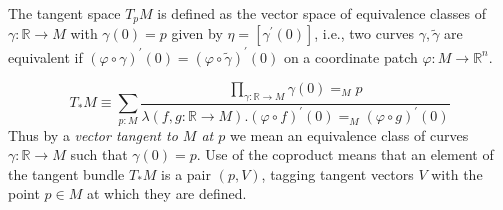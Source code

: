 \documentclass{letter}
\begin{document}
The tangent space $T_p M$ is defined as the vector space of equivalence classes
of $\gamma : \mathbb{R} \to M$ with $\gamma(0) = p$
given by $\eta = [\gamma^\prime(0)]$, i.e., two curves
$\gamma, \tilde{\gamma}$ are equivalent if
$(\varphi \circ \gamma)^\prime(0) = (\varphi \circ \tilde{\gamma})^\prime(0)$
on a coordinate patch $\varphi : M \to \mathbb{R}^n$.

$$
T_{*}M \equiv
  \sum_{p : M}
    \frac{\prod_{\gamma : \mathbb{R} \to M} \gamma(0) =_M p}
         {\lambda (f, g : \mathbb{R} \to M) .
            (\varphi \circ f)^\prime(0) =_M (\varphi \circ g)^\prime(0)}
$$
Thus by a \emph{vector tangent to $M$ at $p$} we mean an equivalence class
of curves $\gamma : \mathbb{R} \to M$ such that $\gamma(0) = p$.
Use of the coproduct means that an element of the tangent bundle $T_{*}M$
is a pair $(p, V)$, tagging tangent vectors $V$ with the point $p \in M$
at which they are defined.
\end{document}
